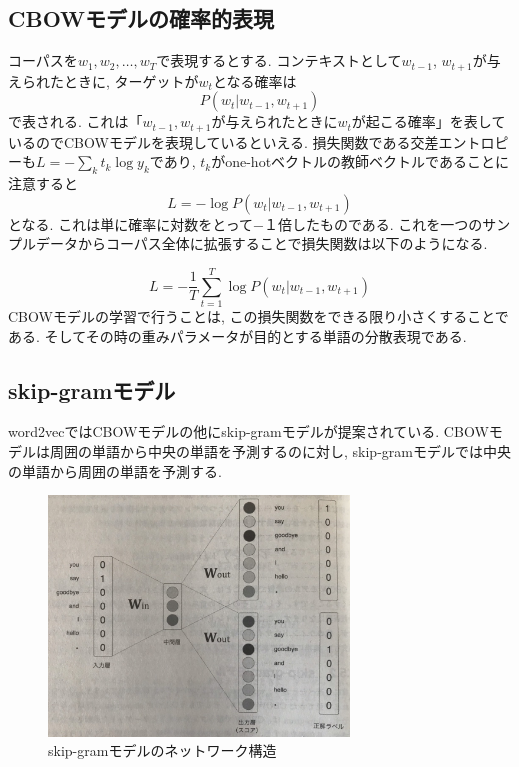 \documentclass[twocolumn]{jarticle}
\begin{document}
\subsection{CBOWモデルの確率的表現}
コーパスを${w_1, w_2, \dots, w_T}$で表現するとする. コンテキストとして${w_{t-1}}$, ${w_{t+1}}$が与えられたときに, ターゲットが${w_t}$となる確率は
\begin{equation}
  P(w_t|w_{t-1}, w_{t+1})
\end{equation}
で表される. これは「${w_{t-1}, w_{t+1}}$が与えられたときに${w_t}$が起こる確率」を表しているのでCBOWモデルを表現しているといえる. 損失関数である交差エントロピーも${L = - \sum_{k} t_k \log y_k }$であり, ${t_k}$がone-hotベクトルの教師ベクトルであることに注意すると
\begin{equation}
  L = - \log P(w_t|w_{t-1}, w_{t+1})
\end{equation}
となる. これは単に確率に対数をとって−１倍したものである. これを一つのサンプルデータからコーパス全体に拡張することで損失関数は以下のようになる.

\begin{equation}
  L = - \frac{1}{T} \sum^{T}_{t=1} \log P(w_t|w_{t-1}, w_{t+1})
\end{equation}
CBOWモデルの学習で行うことは, この損失関数をできる限り小さくすることである. そしてその時の重みパラメータが目的とする単語の分散表現である.


\subsection{skip-gramモデル}
word2vecではCBOWモデルの他にskip-gramモデルが提案されている. CBOWモデルは周囲の単語から中央の単語を予測するのに対し, skip-gramモデルでは中央の単語から周囲の単語を予測する.

\begin{figure}[!htbp]
 \begin{center}
   \includegraphics[width=8cm]{./skip_gram.jpg}
   \caption{skip-gramモデルのネットワーク構造}
   \label{fig:}
 \end{center}
\end{figure}
\end{document}
